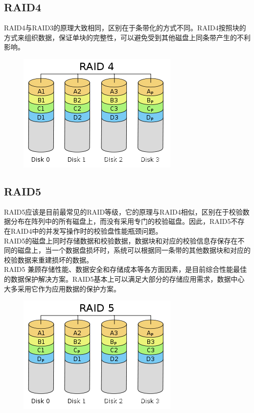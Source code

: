 \subsection{RAID4}

RAID4与RAID3的原理大致相同，区别在于条带化的方式不同。RAID4按照块的方式来组织数据，保证单块的完整性，可以避免受到其他磁盘上同条带产生的不利影响。

\begin{figure}[H]
	\centering
	\includegraphics[]{img/C4/4-5/5.png}
\end{figure}

\subsection{RAID5}

RAID5应该是目前最常见的RAID等级，它的原理与RAID4相似，区别在于校验数据分布在阵列中的所有磁盘上，而没有采用专门的校验磁盘。因此，RAID5不存在RAID4中的并发写操作时的校验盘性能瓶颈问题。 \\

RAID5的磁盘上同时存储数据和校验数据，数据块和对应的校验信息存保存在不同的磁盘上，当一个数据盘损坏时，系统可以根据同一条带的其他数据块和对应的校验数据来重建损坏的数据。 \\

RAID5 兼顾存储性能、数据安全和存储成本等各方面因素，是目前综合性能最佳的数据保护解决方案。RAID5基本上可以满足大部分的存储应用需求，数据中心大多采用它作为应用数据的保护方案。

\begin{figure}[H]
	\centering
	\includegraphics[]{img/C4/4-5/6.png}
\end{figure}

\newpage
